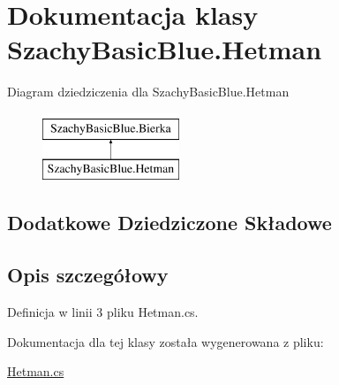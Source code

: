 \hypertarget{class_szachy_basic_blue_1_1_hetman}{\section{Dokumentacja klasy Szachy\-Basic\-Blue.\-Hetman}
\label{class_szachy_basic_blue_1_1_hetman}
}
Diagram dziedziczenia dla Szachy\-Basic\-Blue.\-Hetman\begin{figure}[H]
\begin{center}
\leavevmode
\includegraphics[height=2.000000cm]{class_szachy_basic_blue_1_1_hetman}
\end{center}
\end{figure}
\subsection*{Dodatkowe Dziedziczone Składowe}


\subsection{Opis szczegółowy}


Definicja w linii 3 pliku Hetman.\-cs.



Dokumentacja dla tej klasy została wygenerowana z pliku\-:\begin{DoxyCompactItemize}
\item 
\hyperlink{_hetman_8cs}{Hetman.\-cs}\end{DoxyCompactItemize}

